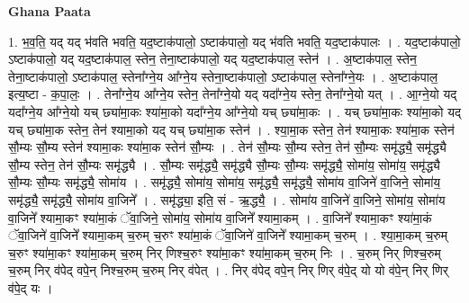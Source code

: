 \documentclass[17pt]{extarticle}
\begin{document}
\textbf{Ghana Paata } \newline

1. भ॒व॒ति॒ यद् यद् भ॑वति भवति॒ यद॒ष्टाक॑पालो॒ ऽष्टाक॑पालो॒ यद् भ॑वति भवति॒ यद॒ष्टाक॑पालः । . यद॒ष्टाक॑पालो॒ ऽष्टाक॑पालो॒ यद् यद॒ष्टाक॑पाल॒ स्तेन॒ तेना॒ष्टाक॑पालो॒ यद् यद॒ष्टाक॑पाल॒ स्तेन॑ । . अ॒ष्टाक॑पाल॒ स्तेन॒ तेना॒ष्टाक॑पालो॒ ऽष्टाक॑पाल॒ स्तेना᳚ग्ने॒य आ᳚ग्ने॒य स्तेना॒ष्टाक॑पालो॒ ऽष्टाक॑पाल॒ स्तेना᳚ग्ने॒यः । . अ॒ष्टाक॑पाल॒ इत्य॒ष्टा - क॒पा॒लः॒ । . तेना᳚ग्ने॒य आ᳚ग्ने॒य स्तेन॒ तेना᳚ग्ने॒यो यद् यदा᳚ग्ने॒य स्तेन॒ तेना᳚ग्ने॒यो यत् । . आ॒ग्ने॒यो यद् यदा᳚ग्ने॒य आ᳚ग्ने॒यो यच् छ्या॑मा॒कः श्या॑मा॒को यदा᳚ग्ने॒य आ᳚ग्ने॒यो यच् छ्या॑मा॒कः । . यच् छ्या॑मा॒कः श्या॑मा॒को यद् यच् छ्या॑मा॒क स्तेन॒ तेन॑ श्यामा॒को यद् यच् छ्या॑मा॒क स्तेन॑ । . श्या॒मा॒क स्तेन॒ तेन॑ श्यामा॒कः श्या॑मा॒क स्तेन॑ सौ॒म्यः सौ॒म्य स्तेन॑ श्यामा॒कः श्या॑मा॒क स्तेन॑ सौ॒म्यः । . तेन॑ सौ॒म्यः सौ॒म्य स्तेन॒ तेन॑ सौ॒म्यः समृ॑द्ध्यै॒ समृ॑द्ध्यै सौ॒म्य स्तेन॒ तेन॑ सौ॒म्यः समृ॑द्ध्यै । . सौ॒म्यः समृ॑द्ध्यै॒ समृ॑द्ध्यै सौ॒म्यः सौ॒म्यः समृ॑द्ध्यै॒ सोमा॑य॒ सोमा॑य॒ समृ॑द्ध्यै सौ॒म्यः सौ॒म्यः समृ॑द्ध्यै॒ सोमा॑य । . समृ॑द्ध्यै॒ सोमा॑य॒ सोमा॑य॒ समृ॑द्ध्यै॒ समृ॑द्ध्यै॒ सोमा॑य वा॒जिने॑ वा॒जिने॒ सोमा॑य॒ समृ॑द्ध्यै॒ समृ॑द्ध्यै॒ सोमा॑य वा॒जिने᳚ । . समृ॑द्ध्या॒ इति॒ सं - ऋ॒द्ध्यै॒ । . सोमा॑य वा॒जिने॑ वा॒जिने॒ सोमा॑य॒ सोमा॑य वा॒जिने᳚ श्यामा॒कꣳ श्या॑मा॒कं ॅवा॒जिने॒ सोमा॑य॒ सोमा॑य वा॒जिने᳚ श्यामा॒कम् । . वा॒जिने᳚ श्यामा॒कꣳ श्या॑मा॒कं ॅवा॒जिने॑ वा॒जिने᳚ श्यामा॒कम् च॒रुम् च॒रुꣳ श्या॑मा॒कं ॅवा॒जिने॑ वा॒जिने᳚ श्यामा॒कम् च॒रुम् । . श्या॒मा॒कम् च॒रुम् च॒रुꣳ श्या॑मा॒कꣳ श्या॑मा॒कम् च॒रुम् निर् णिश्च॒रुꣳ श्या॑मा॒कꣳ श्या॑मा॒कम् च॒रुम् निः । . च॒रुम् निर् णिश्च॒रुम् च॒रुम् निर् व॑पेद् वपे॒न् निश्च॒रुम् च॒रुम् निर् व॑पेत् । . निर् व॑पेद् वपे॒न् निर् णिर् व॑पे॒द् यो यो व॑पे॒न् निर् णिर् व॑पे॒द् यः । \newline
\end{document}
